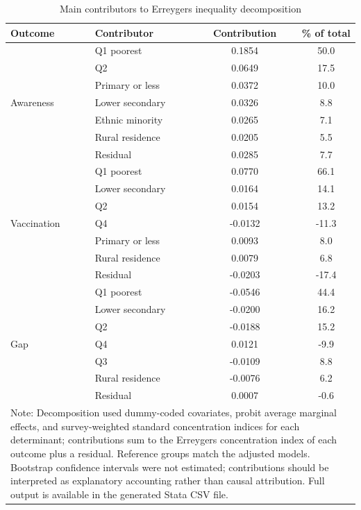 \begin{table}[htbp]
\caption{Main contributors to Erreygers inequality decomposition}
\centering
\small
\begin{tabular}{|p{3.7cm}|p{3.0cm}|c|c|}
\hline
\textbf{Outcome} & \textbf{Contributor} & \textbf{Contribution} & \textbf{\% of total} \\
\hline
\multirow{7}{*}{Awareness} & Q1 poorest & 0.1854 & 50.0 \\
 & Q2 & 0.0649 & 17.5 \\
 & Primary or less & 0.0372 & 10.0 \\
 & Lower secondary & 0.0326 & 8.8 \\
 & Ethnic minority & 0.0265 & 7.1 \\
 & Rural residence & 0.0205 & 5.5 \\
 & Residual & 0.0285 & 7.7 \\
\hline
\multirow{7}{*}{Vaccination} & Q1 poorest & 0.0770 & 66.1 \\
 & Lower secondary & 0.0164 & 14.1 \\
 & Q2 & 0.0154 & 13.2 \\
 & Q4 & -0.0132 & -11.3 \\
 & Primary or less & 0.0093 & 8.0 \\
 & Rural residence & 0.0079 & 6.8 \\
 & Residual & -0.0203 & -17.4 \\
\hline
\multirow{7}{*}{Gap} & Q1 poorest & -0.0546 & 44.4 \\
 & Lower secondary & -0.0200 & 16.2 \\
 & Q2 & -0.0188 & 15.2 \\
 & Q4 & 0.0121 & -9.9 \\
 & Q3 & -0.0109 & 8.8 \\
 & Rural residence & -0.0076 & 6.2 \\
 & Residual & 0.0007 & -0.6 \\
\hline
\multicolumn{4}{|p{13.0cm}|}{\footnotesize Note: Decomposition used dummy-coded covariates, probit average marginal effects, and survey-weighted standard concentration indices for each determinant; contributions sum to the Erreygers concentration index of each outcome plus a residual. Reference groups match the adjusted models. Bootstrap confidence intervals were not estimated; contributions should be interpreted as explanatory accounting rather than causal attribution. Full output is available in the generated Stata CSV file.} \\
\hline
\end{tabular}
\label{tab:decomp}
\end{table}

